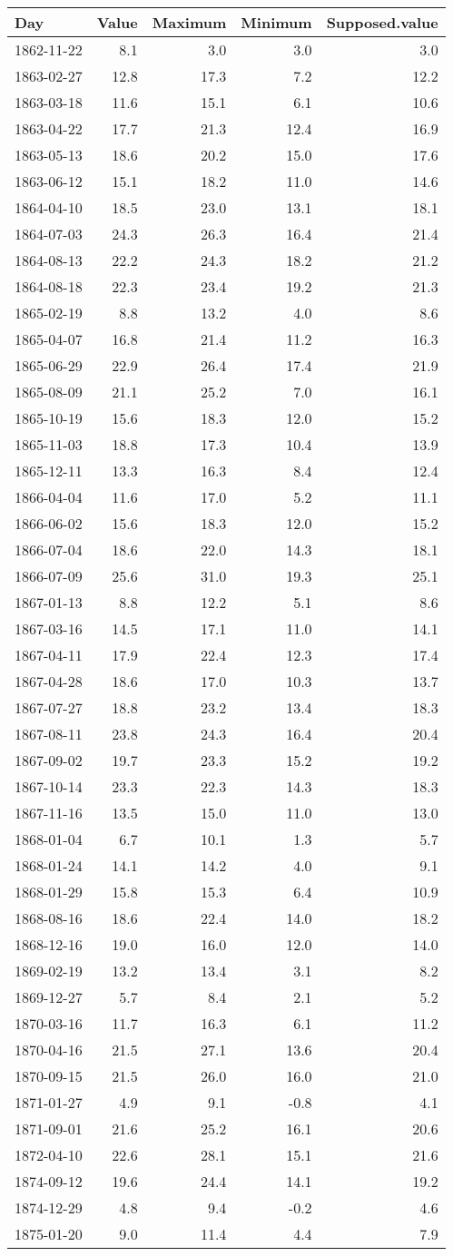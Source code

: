 \documentclass[]{article}
\begin{document}
\begin{longtable}[]{@{}lrrrr@{}}
\toprule
Day & Value & Maximum & Minimum & Supposed.value\tabularnewline
\midrule
\endhead
1862-11-22 & 8.1 & 3.0 & 3.0 & 3.0\tabularnewline
1863-02-27 & 12.8 & 17.3 & 7.2 & 12.2\tabularnewline
1863-03-18 & 11.6 & 15.1 & 6.1 & 10.6\tabularnewline
1863-04-22 & 17.7 & 21.3 & 12.4 & 16.9\tabularnewline
1863-05-13 & 18.6 & 20.2 & 15.0 & 17.6\tabularnewline
1863-06-12 & 15.1 & 18.2 & 11.0 & 14.6\tabularnewline
1864-04-10 & 18.5 & 23.0 & 13.1 & 18.1\tabularnewline
1864-07-03 & 24.3 & 26.3 & 16.4 & 21.4\tabularnewline
1864-08-13 & 22.2 & 24.3 & 18.2 & 21.2\tabularnewline
1864-08-18 & 22.3 & 23.4 & 19.2 & 21.3\tabularnewline
1865-02-19 & 8.8 & 13.2 & 4.0 & 8.6\tabularnewline
1865-04-07 & 16.8 & 21.4 & 11.2 & 16.3\tabularnewline
1865-06-29 & 22.9 & 26.4 & 17.4 & 21.9\tabularnewline
1865-08-09 & 21.1 & 25.2 & 7.0 & 16.1\tabularnewline
1865-10-19 & 15.6 & 18.3 & 12.0 & 15.2\tabularnewline
1865-11-03 & 18.8 & 17.3 & 10.4 & 13.9\tabularnewline
1865-12-11 & 13.3 & 16.3 & 8.4 & 12.4\tabularnewline
1866-04-04 & 11.6 & 17.0 & 5.2 & 11.1\tabularnewline
1866-06-02 & 15.6 & 18.3 & 12.0 & 15.2\tabularnewline
1866-07-04 & 18.6 & 22.0 & 14.3 & 18.1\tabularnewline
1866-07-09 & 25.6 & 31.0 & 19.3 & 25.1\tabularnewline
1867-01-13 & 8.8 & 12.2 & 5.1 & 8.6\tabularnewline
1867-03-16 & 14.5 & 17.1 & 11.0 & 14.1\tabularnewline
1867-04-11 & 17.9 & 22.4 & 12.3 & 17.4\tabularnewline
1867-04-28 & 18.6 & 17.0 & 10.3 & 13.7\tabularnewline
1867-07-27 & 18.8 & 23.2 & 13.4 & 18.3\tabularnewline
1867-08-11 & 23.8 & 24.3 & 16.4 & 20.4\tabularnewline
1867-09-02 & 19.7 & 23.3 & 15.2 & 19.2\tabularnewline
1867-10-14 & 23.3 & 22.3 & 14.3 & 18.3\tabularnewline
1867-11-16 & 13.5 & 15.0 & 11.0 & 13.0\tabularnewline
1868-01-04 & 6.7 & 10.1 & 1.3 & 5.7\tabularnewline
1868-01-24 & 14.1 & 14.2 & 4.0 & 9.1\tabularnewline
1868-01-29 & 15.8 & 15.3 & 6.4 & 10.9\tabularnewline
1868-08-16 & 18.6 & 22.4 & 14.0 & 18.2\tabularnewline
1868-12-16 & 19.0 & 16.0 & 12.0 & 14.0\tabularnewline
1869-02-19 & 13.2 & 13.4 & 3.1 & 8.2\tabularnewline
1869-12-27 & 5.7 & 8.4 & 2.1 & 5.2\tabularnewline
1870-03-16 & 11.7 & 16.3 & 6.1 & 11.2\tabularnewline
1870-04-16 & 21.5 & 27.1 & 13.6 & 20.4\tabularnewline
1870-09-15 & 21.5 & 26.0 & 16.0 & 21.0\tabularnewline
1871-01-27 & 4.9 & 9.1 & -0.8 & 4.1\tabularnewline
1871-09-01 & 21.6 & 25.2 & 16.1 & 20.6\tabularnewline
1872-04-10 & 22.6 & 28.1 & 15.1 & 21.6\tabularnewline
1874-09-12 & 19.6 & 24.4 & 14.1 & 19.2\tabularnewline
1874-12-29 & 4.8 & 9.4 & -0.2 & 4.6\tabularnewline
1875-01-20 & 9.0 & 11.4 & 4.4 & 7.9\tabularnewline

\end{longtable}
\end{document}

